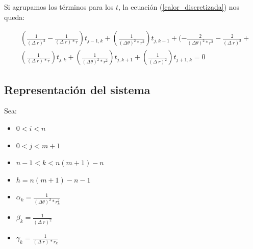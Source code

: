 Si agrupamos los términos para los $t$, la ecuación (\ref{calor_discretizada}) nos queda:

\begin{equation}
   \begin{aligned}
    &(\frac{1}{(\Delta\ r)^2} - \frac{1}{(\Delta\ r) * r})t_{j-1,k} + (\frac{1}{(\Delta\theta)^2 * r^2})t_{j,k-1} +  (-\frac{2}{(\Delta\theta)^2 * r^2}-\frac{2}{(\Delta\ r)^2} +\\
    &(\frac{1} {(\Delta\ r) * r})t_{j,k} + (\frac{1}{(\Delta\theta)^2 * r^2})t_{j,k+1} + (\frac{1}{(\Delta\ r)^2})t_{j+1,k} = 0
    \end{aligned}
\end{equation}

\subsection{Representación del sistema}
Sea:

\begin{itemize}
    \item $0 < i < n$
    \item $0 < j < m+1$
    \item $n-1 < k < n(m+1)-n$
    \item $h = n(m+1)-n-1$
    \item $\alpha_{k} = \frac{1}{(\Delta\theta)^2 * r_{k}^2}$
    \item $\beta_{k} = \frac{1}{(\Delta\ r)^2}$
    \item $\gamma_{k} = \frac{1}{(\Delta\ r) * r_{k}}$
\end{itemize}

